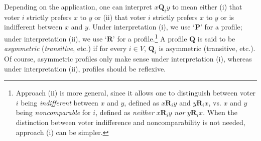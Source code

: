 \documentclass[runningheads]{llncs}
\begin{document}





Depending on the application, one can interpret $x\mathbf{Q}_i y$ to mean either (i) that voter $i$ strictly prefers $x$ to $y$ or (ii) that voter $i$ strictly prefers $x$ to $y$ or is indifferent between $x$ and $y$. Under interpretation (i), we use `$\mathbf{P}$' for a profile; under interpretation (ii), we use `$\mathbf{R}$' for a profile.\footnote{\label{VoterNote}Approach (ii) is more general, since it allows one to distinguish between voter $i$ being \textit{indifferent} between $x$ and $y$, defined as $x\mathbf{R}_iy$ and $y\mathbf{R}_ix$, vs. $x$ and $y$ being \textit{noncomparable} for $i$, defined as \textit{neither} $x\mathbf{R}_iy$ \textit{nor} $y\mathbf{R}_ix$. When the distinction between voter indifference and noncomparability is not needed, approach (i) can be simpler.} A profile $\mathbf{Q}$ is said to be \emph{asymmetric} (\emph{transitive}, etc.) if for every $i\in V$, $\mathbf{Q}_i$ is asymmetric (transitive, etc.). Of course, asymmetric profiles only make sense under interpretation (i), whereas under interpretation (ii), profiles should be reflexive.
\end{document}
